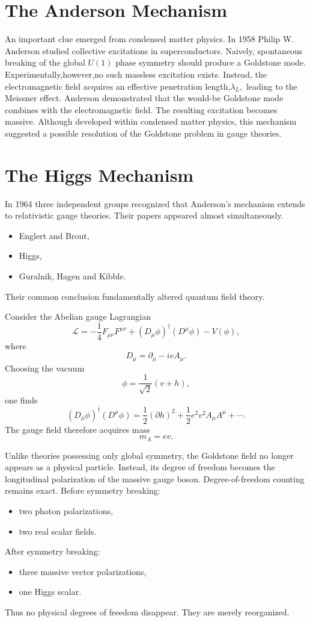 \section{The Anderson Mechanism}
An important clue emerged from condensed matter physics.
In 1958 Philip W. Anderson studied collective excitations in
superconductors.
Naively, spontaneous breaking of the global $U(1)$
phase symmetry should produce a Goldstone mode.
Experimentally,however,no such massless excitation exists.
Instead, the electromagnetic field acquires an effective penetration
length,$\lambda_L,$ leading to the Meissner effect.
Anderson demonstrated that the would-be Goldstone mode combines with the
electromagnetic field.
The resulting excitation becomes massive.
Although developed within condensed matter physics, this mechanism
suggested a possible resolution of the Goldstone problem in gauge
theories.

\section{The Higgs Mechanism}
In 1964 three independent groups recognized that Anderson's mechanism
extends to relativistic gauge theories.
Their papers appeared almost simultaneously.
\begin{itemize}
\item Englert and Brout,
\item Higgs,
\item Guralnik, Hagen and Kibble.
\end{itemize}
Their common conclusion fundamentally altered quantum field theory.

Consider the Abelian gauge Lagrangian
\[\mathcal L=-\frac{1}{4}F_{\mu\nu}F^{\mu\nu}
+(D_\mu\phi)^\dagger (D^\mu\phi)-V(\phi),\]
where
\[D_\mu=\partial_\mu-ieA_\mu.\]
Choosing the vacuum
\[\phi=\frac{1}{\sqrt{2}}(v+h),\]
one finds
\[(D_\mu\phi)^\dagger (D^\mu\phi)=\frac{1}{2}(\partial h)^2
+\frac{1}{2}e^2v^2A_\mu A^\mu+\cdots.\]
The gauge field therefore acquires mass
\[\boxed{m_A=ev.}\]

Unlike theories possessing only global symmetry,
the Goldstone field no longer appears as a physical particle.
Instead,
its degree of freedom becomes the longitudinal polarization of the
massive gauge boson.
Degree-of-freedom counting remains exact.
Before symmetry breaking:
\begin{itemize}
\item two photon polarizations,
\item two real scalar fields.
\end{itemize}
After symmetry breaking:
\begin{itemize}
\item three massive vector polarizations,
\item one Higgs scalar.
\end{itemize}
Thus no physical degrees of freedom disappear.
They are merely reorganized.

